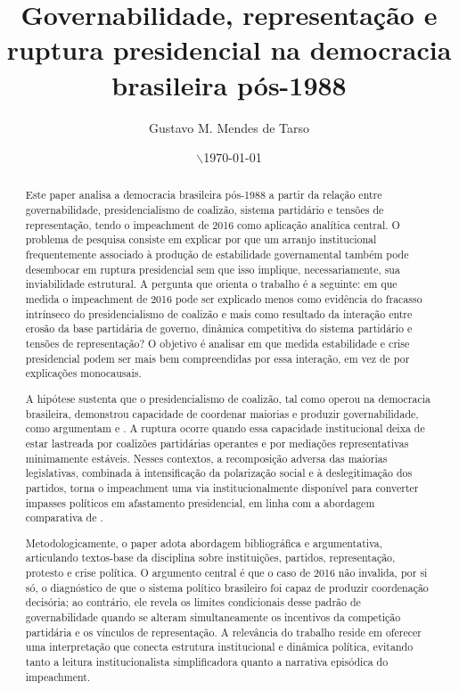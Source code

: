 \documentclass[12pt,a4paper]{article}
\author{Gustavo M. Mendes de Tarso}
\date{$\backslash$\today}
\title{Governabilidade, representação e ruptura presidencial na democracia brasileira pós-1988}
\begin{document}
\makemytitle

\begin{abstract}
Este paper analisa a democracia brasileira pós-1988 a partir da relação entre governabilidade, presidencialismo de coalizão, sistema partidário e tensões de representação, tendo o impeachment de 2016 como aplicação analítica central. O problema de pesquisa consiste em explicar por que um arranjo institucional frequentemente associado à produção de estabilidade governamental também pode desembocar em ruptura presidencial sem que isso implique, necessariamente, sua inviabilidade estrutural. A pergunta que orienta o trabalho é a seguinte: em que medida o impeachment de 2016 pode ser explicado menos como evidência do fracasso intrínseco do presidencialismo de coalizão e mais como resultado da interação entre erosão da base partidária de governo, dinâmica competitiva do sistema partidário e tensões de representação? O objetivo é analisar em que medida estabilidade e crise presidencial podem ser mais bem compreendidas por essa interação, em vez de por explicações monocausais.

A hipótese sustenta que o presidencialismo de coalizão, tal como operou na democracia brasileira, demonstrou capacidade de coordenar maiorias e produzir governabilidade, como argumentam \textcite{palermo2000_como_se} e \textcite{limongi2017_a_crise}. A ruptura ocorre quando essa capacidade institucional deixa de estar lastreada por coalizões partidárias operantes e por mediações representativas minimamente estáveis. Nesses contextos, a recomposição adversa das maiorias legislativas, combinada à intensificação da polarização social e à deslegitimação dos partidos, torna o impeachment uma via institucionalmente disponível para converter impasses políticos em afastamento presidencial, em linha com a abordagem comparativa de \textcite{perez_lian2016_explaining_military}.

Metodologicamente, o paper adota abordagem bibliográfica e argumentativa, articulando textos-base da disciplina sobre instituições, partidos, representação, protesto e crise política. O argumento central é que o caso de 2016 não invalida, por si só, o diagnóstico de que o sistema político brasileiro foi capaz de produzir coordenação decisória; ao contrário, ele revela os limites condicionais desse padrão de governabilidade quando se alteram simultaneamente os incentivos da competição partidária e os vínculos de representação. A relevância do trabalho reside em oferecer uma interpretação que conecta estrutura institucional e dinâmica política, evitando tanto a leitura institucionalista simplificadora quanto a narrativa episódica do impeachment.
\end{abstract}
\end{document}
